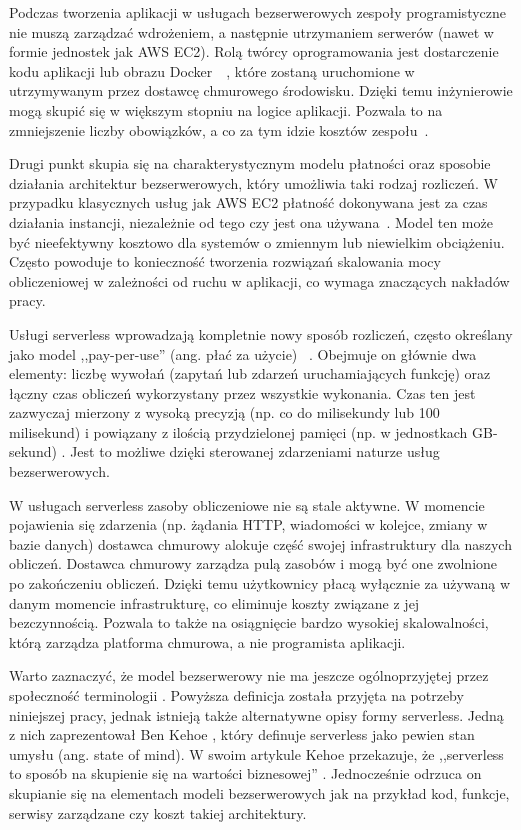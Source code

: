 Podczas tworzenia aplikacji w usługach bezserwerowych zespoły programistyczne nie muszą zarządzać wdrożeniem, a następnie utrzymaniem serwerów (nawet w formie jednostek jak AWS EC2). 
Rolą twórcy oprogramowania jest dostarczenie kodu aplikacji lub obrazu Docker~\cite{awsLambdaDocs}~\cite{awsEcsDevGuide}, które zostaną uruchomione w utrzymywanym przez dostawcę chmurowego środowisku. 
Dzięki temu inżynierowie mogą skupić się w większym stopniu na logice aplikacji. 
Pozwala to na zmniejszenie liczby obowiązków, a co za tym idzie kosztów zespołu~\cite{riseOfThePlanetOfServerlessComputing}. 

Drugi punkt skupia się na charakterystycznym modelu płatności oraz sposobie działania architektur bezserwerowych, który umożliwia taki rodzaj rozliczeń. 
W przypadku klasycznych usług jak AWS EC2 płatność dokonywana jest za czas działania instancji, niezależnie od tego czy jest ona używana~\cite{awsEc2Guide}. 
Model ten może być nieefektywny kosztowo dla systemów o zmiennym lub niewielkim obciążeniu. 
Często powoduje to konieczność tworzenia rozwiązań skalowania mocy obliczeniowej w zależności od ruchu w aplikacji, co wymaga znaczących nakładów pracy.

Usługi serverless wprowadzają kompletnie nowy sposób rozliczeń, często określany jako model ,,pay-per-use'' (ang. płać za użycie) ~\cite{ServerlessApplicationsWhyWhenAndHow}.
Obejmuje on głównie dwa elementy: liczbę wywołań (zapytań lub zdarzeń uruchamiających funkcję) oraz łączny czas obliczeń wykorzystany przez wszystkie wykonania. 
Czas ten jest zazwyczaj mierzony z wysoką precyzją (np. co do milisekundy lub 100 milisekund) i powiązany z ilością przydzielonej pamięci (np. w jednostkach GB-sekund) \cite{awsLambdaDocs}.
Jest to możliwe dzięki sterowanej zdarzeniami naturze usług bezserwerowych.

W usługach serverless zasoby obliczeniowe nie są stale aktywne. 
W momencie pojawienia się zdarzenia (np. żądania HTTP, wiadomości w kolejce, zmiany w bazie danych) dostawca chmurowy alokuje część swojej infrastruktury dla naszych obliczeń.
Dostawca chmurowy zarządza pulą zasobów i mogą być one zwolnione po zakończeniu obliczeń.
Dzięki temu użytkownicy płacą wyłącznie za używaną w danym momencie infrastrukturę, co eliminuje koszty związane z jej bezczynnością.
Pozwala to także na osiągnięcie bardzo wysokiej skalowalności, którą zarządza platforma chmurowa, a nie programista aplikacji.

Warto zaznaczyć, że model bezserwerowy nie ma jeszcze ogólnoprzyjętej przez społeczność terminologii \cite{SpecRgCloudGroupVisionOnThePerformanceChallengesOfFaas}.
Powyższa definicja została przyjęta na potrzeby niniejszej pracy, jednak istnieją także alternatywne opisy formy serverless.
Jedną z nich zaprezentował Ben Kehoe \cite{kehoe_serverless_2018}, który definuje serverless jako pewien stan umysłu (ang. state of mind).
W swoim artykule Kehoe przekazuje, że ,,serverless to sposób na skupienie się na wartości biznesowej'' \cite{kehoe_serverless_2018}.
Jednocześnie odrzuca on skupianie się na elementach modeli bezserwerowych jak na przykład kod, funkcje, serwisy zarządzane czy koszt takiej architektury.

